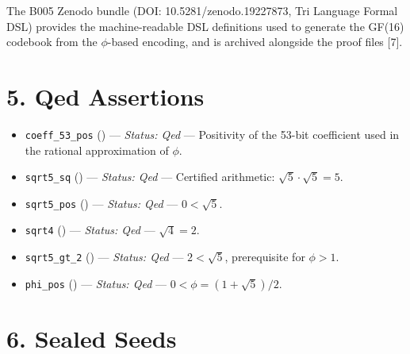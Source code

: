 The B005 Zenodo bundle (DOI:
10.5281/zenodo.19227873, Tri Language Formal DSL)
provides the machine-readable DSL definitions used
to generate the GF(16) codebook from the
\(\phi\)-based encoding, and is archived alongside
the proof files [7].

\section{5. Qed
Assertions}\label{fa_10:qed-assertions}

\begin{itemize}
\tightlist
\item
  \texttt{coeff\_53\_pos}
  ()
  --- \emph{Status: Qed} --- Positivity of the
  53-bit coefficient used in the rational
  approximation of \(\phi\).
\item
  \texttt{sqrt5\_sq}
  ()
  --- \emph{Status: Qed} --- Certified arithmetic:
  \(\sqrt{5} \cdot \sqrt{5} = 5\).
\item
  \texttt{sqrt5\_pos}
  ()
  --- \emph{Status: Qed} --- \(0 < \sqrt{5}\).
\item
  \texttt{sqrt4}
  ()
  --- \emph{Status: Qed} --- \(\sqrt{4} = 2\).
\item
  \texttt{sqrt5\_gt\_2}
  ()
  --- \emph{Status: Qed} --- \(2 < \sqrt{5}\),
  prerequisite for \(\phi > 1\).
\item
  \texttt{phi\_pos}
  ()
  --- \emph{Status: Qed} ---
  \(0 < \phi = (1+\sqrt{5})/2\).
\end{itemize}

\section{6. Sealed Seeds}\label{fa_10:sealed-seeds}

